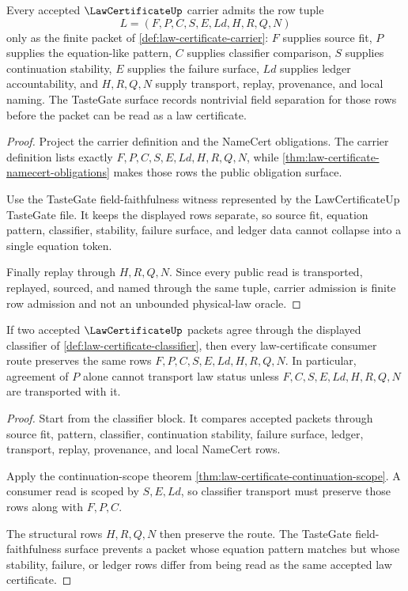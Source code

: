 \begin{theorem}
\label{thm:law-certificate-carrier-admission}
Every accepted $\LawCertificateUp$ carrier admits the row tuple
$$
L=(F,P,C,S,E,Ld,H,R,Q,N)
$$
only as the finite packet of \autoref{def:law-certificate-carrier}: $F$ supplies source fit, $P$ supplies the equation-like pattern, $C$ supplies classifier comparison, $S$ supplies continuation stability, $E$ supplies the failure surface, $Ld$ supplies ledger accountability, and $H,R,Q,N$ supply transport, replay, provenance, and local naming. The TasteGate surface records nontrivial field separation for those rows before the packet can be read as a law certificate.
\end{theorem}
\begin{proof}
Project the carrier definition and the NameCert obligations. The carrier definition lists exactly $F,P,C,S,E,Ld,H,R,Q,N$, while \autoref{thm:law-certificate-namecert-obligations} makes those rows the public obligation surface.

Use the TasteGate field-faithfulness witness represented by the LawCertificateUp TasteGate file. It keeps the displayed rows separate, so source fit, equation pattern, classifier, stability, failure surface, and ledger data cannot collapse into a single equation token.

Finally replay through $H,R,Q,N$. Since every public read is transported, replayed, sourced, and named through the same tuple, carrier admission is finite row admission and not an unbounded physical-law oracle.
\end{proof}

\begin{theorem}
\label{thm:law-certificate-classifier-stability}
If two accepted $\LawCertificateUp$ packets agree through the displayed classifier of \autoref{def:law-certificate-classifier}, then every law-certificate consumer route preserves the same rows $F,P,C,S,E,Ld,H,R,Q,N$. In particular, agreement of $P$ alone cannot transport law status unless $F,C,S,E,Ld,H,R,Q,N$ are transported with it.
\end{theorem}
\begin{proof}
Start from the classifier block. It compares accepted packets through source fit, pattern, classifier, continuation stability, failure surface, ledger, transport, replay, provenance, and local NameCert rows.

Apply the continuation-scope theorem \autoref{thm:law-certificate-continuation-scope}. A consumer read is scoped by $S,E,Ld$, so classifier transport must preserve those rows along with $F,P,C$.

The structural rows $H,R,Q,N$ then preserve the route. The TasteGate field-faithfulness surface prevents a packet whose equation pattern matches but whose stability, failure, or ledger rows differ from being read as the same accepted law certificate.
\end{proof}

